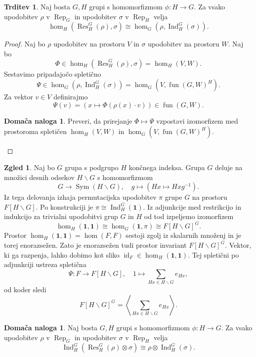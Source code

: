 \documentclass[11pt]{book}
\def\oneone{\mathbf{1}}
\DeclareMathOperator\Res{Res}
\DeclareMathOperator\Ind{Ind}
\DeclareMathOperator\Rep{Rep}
\DeclareMathOperator\fun{fun}
\DeclareMathOperator\Sym{Sym}
\DeclareMathOperator\id{id}
\theoremstyle{definition}
\theoremstyle{zgled}
\newtheorem{zgled}[theorem]{Zgled}
\theoremstyle{zgledbrezstevilke}
\theoremstyle{odprtproblem}
\theoremstyle{domacanaloga}
\newtheorem{domacanaloga}[theorem]{Domača naloga}
\newenvironment{dokaz}
    {\color{siva}\begin{proof}}
    {\end{proof}}
\theoremstyle{izrek}
\newtheorem{trditev}[theorem]{Trditev}
\begin{document}
\begin{trditev}
    Naj bosta $G,H$ grupi s homomorfizmom $\phi \colon H \to G$. Za vsako upodobitev $\rho$ v $\Rep_G$ in upodobitev $\sigma$ v $\Rep_H$ velja
    \[
        \textstyle \hom_H(\Res^G_H(\rho), \sigma) \cong 
        \hom_G(\rho, \Ind^G_H(\sigma)).
    \]
\end{trditev}
\begin{dokaz}
Naj bo $\rho$ upodobitev na prostoru $V$ in $\sigma$ upodobitev na prostoru $W$. Naj bo
\[
    \textstyle \Phi \in \hom_H(\Res^G_H(\rho), \sigma) = \hom_H(V, W).
\]
Sestavimo pripadajočo spletično
\[
    \textstyle \Psi \in \hom_G(\rho, \Ind^G_H(\sigma)) = \hom_G(V, \fun(G,W)^H).
    \]
Za vektor $v \in V$ definirajmo
\[
    \Psi(v) = \left( x \mapsto \Phi(\rho(x) \cdot v) \right) \in \fun(G,W).
\]

\begin{domacanaloga}
    Preveri, da prirejanje $\Phi \mapsto \Psi$ vzpostavi izomorfizem med prostoroma spletičen $\hom_H(V,W)$ in $\hom_G(V,\fun(G,W)^H)$.
\end{domacanaloga}
\end{dokaz}

\begin{zgled}
Naj bo $G$ grupa s podgrupo $H$ končnega indeksa. Grupa $G$ deluje na množici desnih odsekov $H \backslash G$ s homomorfizmom
\[
    G \to \Sym(H \backslash G), \quad
    g \mapsto \left( Hx \mapsto Hxg^{-1} \right).
\]
Iz tega delovanja izhaja permutacijska upodobitev $\pi$ grupe $G$ na prostoru $F[H \backslash G]$. Po konstrukciji je $\pi \cong \Ind^G_H(\oneone)$. Iz adjunkcije med restrikcijo in indukcijo za trivialni upodobitvi grup $G$ in $H$ od tod izpeljemo izomorfizem
\[
    \hom_H(\oneone, \oneone) \cong \hom_G(\oneone, \pi) \cong F[H \backslash G]^G.
\]
Prostor $\hom_H(\oneone, \oneone) = \hom(F,F)$ sestoji zgolj iz skalarnih množenj in je torej enorazsežen. Zato je enorazsežen tudi prostor invariant $F[H \backslash G]^G$. Vektor, ki ga razpenja, lahko dobimo kot sliko $\id_F \in \hom_H(\oneone, \oneone)$. Tej spletični po adjunkciji ustreza spletična
\[
    \Psi \colon F \to F[H \backslash G], \quad
    1 \mapsto \sum_{Hx \in H \backslash G} e_{Hx},
\] 
od koder sledi
\[
    F[H \backslash G]^G = \left\langle \sum_{Hx \in H \backslash G} e_{Hx} \right\rangle.
\]
\end{zgled}

\begin{domacanaloga}
    Naj bosta $G,H$ grupi s homomorfizmom $\phi \colon H \to G$. Za vsako upodobitev $\rho$ v $\Rep_G$ in upodobitev $\sigma$ v $\Rep_H$ velja
    \[
        \textstyle \Ind^G_H(\Res^G_H(\rho) \otimes \sigma) \cong
        \rho \otimes \Ind^G_H(\sigma).
    \]
\end{domacanaloga}
\end{document}
